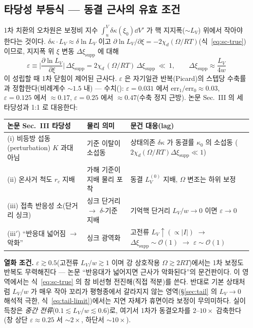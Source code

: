 \subsection{타당성 부등식 --- 동결 근사의 유효 조건}\label{sec:sc-valid-sub}
1차 치환의 오차원은 보정비 지수 $\int_u^V\delta\kappa(\xi_0)\dd V'$ 가 핵 지지폭($\sim L_V$) 위에서 작아야 한다는 것이다.
$\delta\kappa\cdot L_V\approx\delta\ln L_V$ 이고 $\partial\ln L_V/\partial\xi=-2\chi_d(\Omega/RT)$(식~\eqref{eq:sc-true})이므로,
지지폭 위 $\xi$ 변동 $\Delta\xi_{\text{supp}}$ 에 대해
\begin{equation}
\boxed{\;\varepsilon\equiv\Big|\frac{\partial\ln L_V}{\partial\xi}\Big|\,\Delta\xi_{\text{supp}}
=2\chi_d\,(\Omega/RT)\,\Delta\xi_{\text{supp}}\ \ll\ 1,\qquad \Delta\xi_{\text{supp}}\approx\frac{L_V}{4w}\;}
\label{eq:sc-valid}
\end{equation}
이 성립할 때 1차 닫힘이 제어된 근사다. $\varepsilon$ 은 자기일관 반복(Picard)의 스텝당 수축률과 정합한다(비례계수
$\sim1.5$ 내) --- 수치(): $\varepsilon=0.031$ 에서 $\mathrm{err}_1/\mathrm{err}_0\approx0.03$,
$\varepsilon=0.125$ 에서 $\approx0.17$, $\varepsilon=0.25$ 에서 $\approx0.47$(수축 정지 근방). 논문 Sec.~III 의 세 타당성과 1:1 로 대응한다:
\begin{center}
\renewcommand{\arraystretch}{1.25}
\begin{tabular}{@{}p{}p{}p{}@{}}
\toprule
논문 Sec.~III 타당성 & 물리 의미 & 문건 대응(lag) \\
\midrule
(i) 비등방 섭동(perturbation) $K$ 과대 아님 & 기준 이탈이 소섭동 & 상태의존 $\delta\kappa$ 가 동결률 $\kappa_0$ 의 소섭동 ($2\chi_d(\Omega/RT)\Delta\xi_{\text{supp}}\ll1$) \\
(ii) 온사거 척도 $r_c$ 지배 & 가해 기준이 지배 물리 포착 & 동결 $L_V^{(0)}$ 지배, $\Omega$ 변조는 하위 보정 \\
(iii) 접촉 반응성 소(단거리 싱크) & 싱크 단거리 $\to$ $\delta$-기준 지배 & 기억핵 단거리 $L_V/w\to0$ 이면 $\varepsilon\to0$ \\
(iii$'$) ``반응대 넓어짐 $\to$ 악화'' & 싱크 광역화 & 고전류 $L_V\!\uparrow(\propto|I|)$ $\to$ $\Delta\xi_{\text{supp}}\!\sim\!\mathcal O(1)$ $\to$ $\varepsilon\!\sim\!\mathcal O(1)$ \\
\bottomrule
\end{tabular}
\end{center}

\begin{warnbox}
\textbf{열화 조건.} $\varepsilon\gtrsim0.5$(고전류 $L_V/w\gtrsim1$ 이며 강 상호작용 $\Omega\gtrsim2RT$)에서는 1차 보정도
반복도 무력해진다 --- 논문 ``반응대가 넓어지면 근사가 악화된다''의 문건판이다. 이 영역에서는 식~\eqref{eq:sc-true} 의
참 비선형 전진해(직접 적분)를 쓴다. 반대로 기본 상태처럼 $L_V/w$ 가 매우 작아 꼬리가 평형종에서 갈라지지 않는
영역(\S\ref{sec:tail} 의 $L_V\!\to\!0$ 해석적 극한, 식~\eqref{eq:tail-limit})에서는 지연 자체가 휴면이라 보정이 무의미하다.
실이득창은 \emph{중간 전류}($0.1\lesssim L_V/w\lesssim0.6$)로, 여기서 1차가 동결오차를 $2$--$10\times$ 감축한다
(창 상단 $\varepsilon\!\approx\!0.25$ 서 $\sim\!2\times$, 하단서 $\sim\!10\times$).
\end{warnbox}

